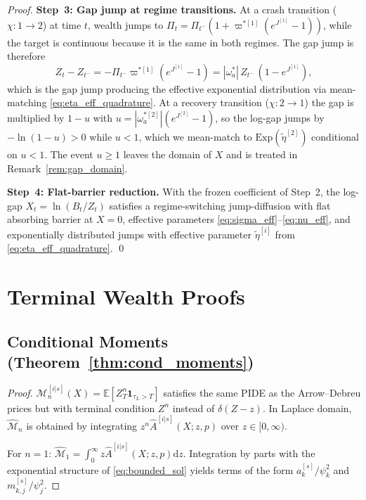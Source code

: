 \documentclass[11pt,a4paper]{article}
\numberwithin{equation}{section}
\newcommand{\E}{\mathbb{E}}
\newcommand{\dd}{\mathrm{d}}
\newcommand{\ind}{\mathbf{1}}
\begin{document}
\begin{appendices}
\begin{proof}
\medskip\noindent\textbf{Step~3: Gap jump at regime transitions.}
At a crash transition ($\chi: 1 \to 2$) at time $t$, wealth jumps to $\Pi_t = \Pi_{t^-}(1 + \varpi^{*[1]}(e^{J^{[1]}} - 1))$, while the target is continuous because it is the same in both regimes.  The gap jump is therefore
\begin{equation}\label{eq:gap_jump_full}
Z_t - Z_{t^-} = -\Pi_{t^-}\varpi^{*[1]}(e^{J^{[1]}} - 1) = |\omega^*_a|\,Z_{t^-}\,(1 - e^{J^{[1]}}),
\end{equation}
which is the gap jump producing the effective exponential distribution via mean-matching \eqref{eq:eta_eff_quadrature}.  At a recovery transition ($\chi: 2 \to 1$) the gap is multiplied by $1 - u$ with $u = |\omega^{*[2]}_a|(e^{J^{[2]}} - 1)$, so the log-gap jumps by $-\ln(1 - u) > 0$ while $u < 1$, which we mean-match to $\mathrm{Exp}(\tilde\eta^{[2]})$ conditional on $u < 1$.  The event $u \geq 1$ leaves the domain of $X$ and is treated in Remark~\ref{rem:gap_domain}.

\medskip\noindent\textbf{Step~4: Flat-barrier reduction.}
With the frozen coefficient of Step~2, the log-gap $X_t = \ln(B_t/Z_t)$ satisfies a regime-switching jump-diffusion with flat absorbing barrier at $X = 0$, effective parameters \eqref{eq:sigma_eff}--\eqref{eq:nu_eff}, and exponentially distributed jumps with effective parameter $\tilde\eta^{[i]}$ from \eqref{eq:eta_eff_quadrature}.
\qed
\end{proof}


\section{Terminal Wealth Proofs}\label{app:terminal_proofs}

\subsection{Conditional Moments (Theorem~\ref{thm:cond_moments})}\label{app:cond_moments}

\begin{proof}
$\mathcal{M}^{[i|s]}_n(X) = \E[Z_T^n \ind_{\tau_L > T}]$ satisfies the same PIDE as the Arrow--Debreu prices but with terminal condition $Z^n$ instead of $\delta(Z-z)$. In Laplace domain, $\hat{\mathcal{M}}_n$ is obtained by integrating $z^n \hat{A}^{[i|s]}(X; z, p)$ over $z \in [0, \infty)$.

For $n = 1$: $\hat{\mathcal{M}}_1 = \int_0^\infty z \hat{A}^{[i|s]}(X;z,p) \dd z$. Integration by parts with the exponential structure of \eqref{eq:bounded_sol} yields terms of the form $a^{[s]}_k/\psi_k^2$ and $m^{[s]}_{k,j}/\psi_j^2$.


\end{proof}
\end{appendices}
\end{document}
